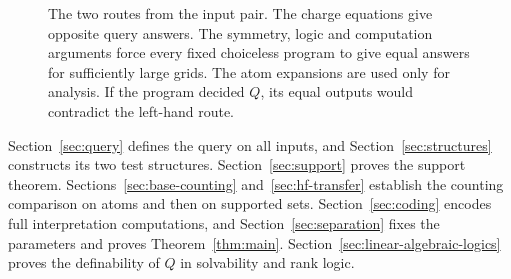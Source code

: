 \begin{figure}[t]
\centering

\caption{The two routes from the input pair. The charge equations give
opposite query answers. The symmetry, logic and computation arguments
force every fixed choiceless program to give equal answers for sufficiently
large grids. The atom expansions are used only for analysis. If the
program decided $Q$, its equal outputs would contradict the left-hand route.}
\label{fig:proof-map}
\end{figure}

Section~\ref{sec:query} defines the query on all inputs, and
Section~\ref{sec:structures} constructs its two test structures.
Section~\ref{sec:support} proves the support theorem.
Sections~\ref{sec:base-counting} and~\ref{sec:hf-transfer} establish the
counting comparison on atoms and then on supported sets.
Section~\ref{sec:coding} encodes full interpretation computations, and
Section~\ref{sec:separation} fixes the parameters and proves
Theorem~\ref{thm:main}.
Section~\ref{sec:linear-algebraic-logics} proves the definability
of $Q$ in solvability and rank logic.
